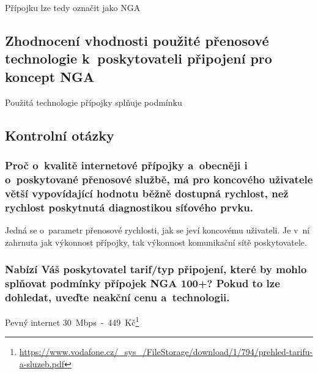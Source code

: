 \documentclass[a4paper,12pt]{article}   %
\begin{document}
Přípojku lze tedy označit jako NGA


\subsection*{Zhodnocení vhodnosti použité přenosové technologie k~poskytovateli připojení pro koncept NGA}
Použitá technologie přípojky splňuje podmínku 

\subsection*{Kontrolní otázky}

\subsubsection*{Proč o~kvalitě internetové přípojky a~obecněji i o~poskytované přenosové službě, má pro koncového uživatele větší vypovídající hodnotu běžně dostupná rychlost, než rychlost poskytnutá diagnostikou síťového prvku.}
Jedná se o~parametr přenosové rychlosti, jak se jeví koncovému uživateli. Je v~ní zahrnuta jak výkonnost přípojky, tak výkonnost komunikační sítě poskytovatele.

\subsubsection*{Nabízí Váš poskytovatel tarif/typ připojení, které by mohlo splňovat podmínky přípojek NGA 100+? Pokud to lze dohledat, uveďte neakční cenu a~technologii.}
Pevný internet 30~Mbps~-~449~Kč\footnote{\url{https://www.vodafone.cz/_sys_/FileStorage/download/1/794/prehled-tarifu-a-sluzeb.pdf}}
\end{document}
